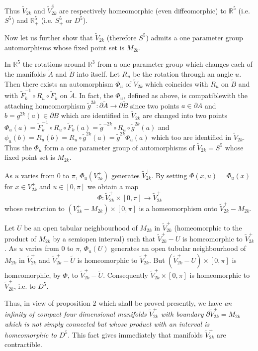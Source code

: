 Thus $\tilde{V}_{2k}$ and $\tilde{V}^4_{2k}$ are respectively
homeomorphic (even diffeomorphic) to $\mathbb{R}^5$ (i.e. $S^5$) and
$\mathbb{R}^5_+$ (i.e. $S^5 _+$ or $D^5$). 

Now let us further show that $\tilde{V}_{2k}$ (therefore $S^5$) admits
a one parameter group automorphisms whose fixed point set is
$M_{2k}$. 

In $\mathbb{R}^5$ the rotations around $\mathbb{R}^3$ from a one
parameter group which changes each of the manifolds $\tilde{A}$ and
$\tilde{B}$ into itself. Let $R_u$ be the rotation through an angle
$u$. Then there exists an automorphism $\Phi_u$ of $\tilde{V}_{2k}$
which coincides with $R_u$ on $\tilde{B}$ and with $\tilde{F}^{-1}_k \circ
R_u \circ \tilde{F}_k$ on $\tilde{A}$. In fact, the $\Phi_u$, defined as
above, is compatible\pageoriginale with the attaching homeomorphism
$\tilde{g}^{2k} : \partial \tilde{A} \to \partial \tilde{B}$ since two
points $a \in 
\partial A$ and $b = g^{2k} (a) \in \partial B$ which are identified
in $\tilde{V}_{2k}$ are changed into two points $\Phi _u (a) = \tilde{F}_k
^{-1} \circ R_u \circ \tilde{F}_k (a) = \tilde{g}^{-2k} \circ R_u
\circ \tilde{g}^{2k} 
(a)$ and $\phi_u (b) = R_u (b) = R_u \circ \tilde{g}^{2k} (a) =
\tilde{g}^{2k} \Phi_u (a)$ which too are identified in
$\tilde{V}_{2k}$. Thus the $\Phi_u$ form a one parameter group of
automorphisms of $\tilde{V}_{2k} = S^5$ whose fixed point set is
$M_{2k}$. 

As $u$ varies from 0 to $\pi$, $\Phi_u (V^+_{2k})$ generates
$\tilde{V}_{2k}^+$. By setting $\Phi (x, u)= \Phi_u (x)$ for $x \in
V^+_{2k}$ and $u \in [0, \pi]$ we obtain a map 
$$
\Phi : \tilde{V}_{2k}^+ \times [0, \pi] \to \tilde{V}_{2k}^+
$$
whose restriction to $(V^+_{2k}- M_{2k}) \times [ 0, \pi]$ is a
homeomorphism onto $\tilde{V}^{+}_{2k} - M_{2k}$. 

Let $U$ be an open tabular neighbourhood of $M_{2k}$ in
$\tilde{V}_{2k}^+$ (homeomorphic to the product of $M_{2k}$ by a
semiopen interval) such that $\tilde{V}_{2k}^+ - U$ is homeomorphic to 
$\tilde{V}_{2k}^+$. As $u$ varies from 0 to $\pi$, $\Phi_u (U)$
generates an open tubular neighbourhood of $M_{2k}$ in
$\tilde{V}_{2k}^+$ and $\tilde{V}_{2k}^+ - \tilde{U}$ is homeomorphic
to $\tilde{V}_{2k}^+$. But $(\tilde{V}_{2k}^+ - U) \times [0,\pi]$ is
homeomorphic, by $\Phi$, to $\tilde{V}_{2k}^+ - \tilde{U}$. Consequently
$\tilde{V}_{2k}^+ \times [0, \pi]$ is homeomorphic to
$\tilde{V}_{2k}^+ $, i.e. to $D^5$. 

Thus, in view of proposition 2 which shall be proved presently, we
have \textit{an infinity of compact four dimensional manifolds
  $\tilde{V}^+_{2k}$ with boundary $ \partial\tilde{V}_{2k}^+ = M_{2k}$
  which is not simply connected but whose product with an interval is
  homeomorphic to $D^5$}. This fact gives immediately that manifolds
$\tilde{V}_{2k}^+$ are contractible.  

